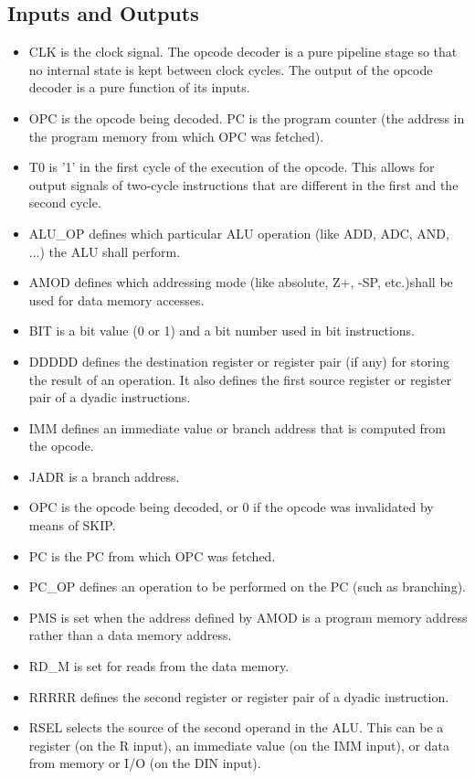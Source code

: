 \documentclass[12pt,a4paper]{report}
\begin{document}
\subsection{Inputs and Outputs}
\begin{itemize}
  \item CLK is the clock signal. The opcode decoder is a pure pipeline stage so that no internal state is kept between clock cycles. The output of the opcode decoder is a pure function of its inputs.
  \item OPC is the opcode being decoded.
PC is the program counter (the address in the program memory from which OPC was fetched).
  \item T0 is '1' in the first cycle of the execution of the opcode. This allows for output signals of two-cycle instructions that are different in the first and the second cycle.
  \item ALU\_OP defines which particular ALU operation (like ADD, ADC, AND, ...) the ALU shall perform.
  \item AMOD defines which addressing mode (like absolute, Z+, -SP, etc.)shall be used for data memory accesses.
  \item BIT is a bit value (0 or 1) and a bit number used in bit instructions.
  \item DDDDD defines the destination register or register pair (if any) for storing the result of an operation. It also defines the first source register or register pair of a dyadic instructions.
  \item IMM defines an immediate value or branch address that is computed from the opcode.
  \item JADR is a branch address.
  \item OPC is the opcode being decoded, or 0 if the opcode was invalidated by means of SKIP.
  \item PC is the PC from which OPC was fetched.
  \item PC\_OP defines an operation to be performed on the PC (such as branching).
  \item PMS is set when the address defined by AMOD is a program memory address rather than a data memory address.
  \item RD\_M is set for reads from the data memory.
  \item RRRRR defines the second register or register pair of a dyadic instruction.
  \item RSEL selects the source of the second operand in the ALU. This can be a register (on the R input), an immediate value (on the IMM input), or data from memory or I/O (on the DIN input).
\end{itemize}
\end{document}
